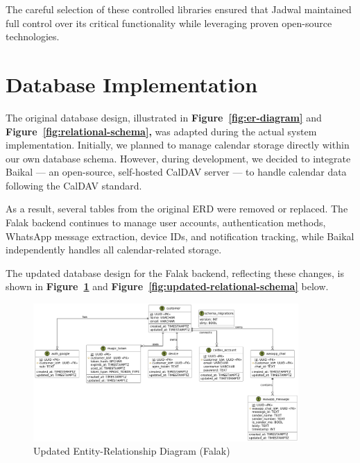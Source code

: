 The careful selection of these controlled libraries ensured that Jadwal maintained full control over its critical functionality while leveraging proven open-source technologies.

\section{Database Implementation}

The original database design, illustrated in \textbf{Figure~\ref{fig:er-diagram}} and \textbf{Figure~\ref{fig:relational-schema},} was adapted during the actual system implementation. Initially, we planned to manage calendar storage directly within our own database schema. However, during development, we decided to integrate Baikal — an open-source, self-hosted CalDAV server — to handle calendar data following the CalDAV standard.

As a result, several tables from the original ERD were removed or replaced. The Falak backend continues to manage user accounts, authentication methods, WhatsApp message extraction, device IDs, and notification tracking, while Baikal independently handles all calendar-related storage.

The updated database design for the Falak backend, reflecting these changes, is shown in \textbf{Figure~\ref{fig:updated-er-diagram}} and \textbf{Figure~\ref{fig:updated-relational-schema}} below.

\begin{figure}[!h]
    \centering
    \includegraphics[width=0.9\textwidth]{images/docs/diagrams/er/new-database/Updated Falak ERD.png}
    \caption{Updated Entity-Relationship Diagram (Falak)}
    \label{fig:updated-er-diagram}
\end{figure}


